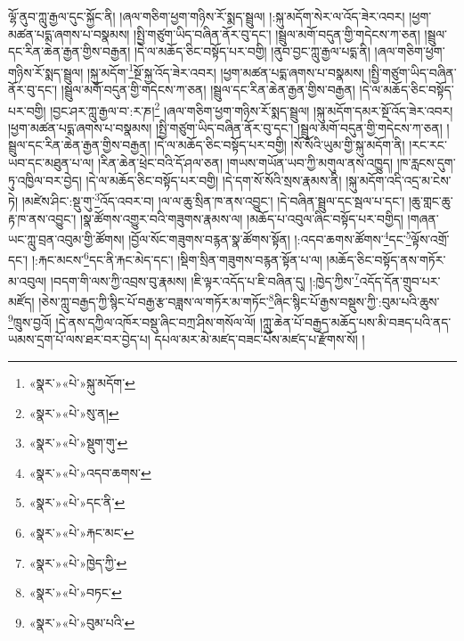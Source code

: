 ལྷོ་ནུབ་ཀླུ་རྒྱལ་དུང་སྐྱོང་ནི། །ཞལ་གཅིག་ཕྱག་གཉིས་རོ་སྨད་སྦྲུལ། །:སྐུ་མདོག་སེར་ལ་འོད་ཟེར་འབར། །ཕྱག་མཚན་པདྨ་ཞགས་པ་བསྣམས། །སྤྱི་གཙུག་ཡིད་བཞིན་ནོར་བུ་དང་། །སྦྲུལ་མགོ་བདུན་གྱི་གདེངས་ཀ་ཅན། །སྦྲུལ་དང་རིན་ཆེན་རྒྱན་གྱིས་བརྒྱན། །དེ་ལ་མཆོད་ཅིང་བསྟོད་པར་བགྱི། །ནུབ་བྱང་ཀླུ་རྒྱལ་པདྨ་ནི། །ཞལ་གཅིག་ཕྱག་གཉིས་རོ་སྨད་སྦྲུལ། །སྐུ་མདོག་\footnote{«སྣར་»«པེ་»སྐུ་མདོག་}སྔོ་སྐྱ་འོད་ཟེར་འབར། །ཕྱག་མཚན་པདྨ་ཞགས་པ་བསྣམས། །སྤྱི་གཙུག་ཡིད་བཞིན་ནོར་བུ་དང་། །སྦྲུལ་མགོ་བདུན་གྱི་གདེངས་ཀ་ཅན། །སྦྲུལ་དང་རིན་ཆེན་རྒྱན་གྱིས་བརྒྱན། །དེ་ལ་མཆོད་ཅིང་བསྟོད་པར་བགྱི། །བྱང་ཤར་ཀླུ་རྒྱལ་བ་:ར་ཎ།\footnote{«སྣར་»«པེ་»སུ་ན།} །ཞལ་གཅིག་ཕྱག་གཉིས་རོ་སྨད་སྦྲུལ། །སྐུ་མདོག་དམར་སྔོ་འོད་ཟེར་འབར། །ཕྱག་མཚན་པདྨ་ཞགས་པ་བསྣམས། །སྤྱི་གཙུག་ཡིད་བཞིན་ནོར་བུ་དང་། །སྦྲུལ་མགོ་བདུན་གྱི་གདེངས་ཀ་ཅན། །སྦྲུལ་དང་རིན་ཆེན་རྒྱན་གྱིས་བརྒྱན། །དེ་ལ་མཆོད་ཅིང་བསྟོད་པར་བགྱི། །སོ་སོའི་ཡུམ་གྱི་སྐུ་མདོག་ནི། །རང་རང་ཡབ་དང་མཐུན་པ་ལ། །རིན་ཆེན་ཕྲེང་བའི་དོ་ཤལ་ཅན། །གཡས་གཡོན་ཡབ་ཀྱི་མགུལ་ནས་འཁྱུད། །ཁ་རླངས་དུག་ཏུ་འཁྱིལ་བར་བྱེད། །དེ་ལ་མཆོད་ཅིང་བསྟོད་པར་བགྱི། །དེ་དག་སོ་སོའི་སྲས་རྣམས་ནི། །སྐུ་མདོག་འདི་འདྲ་མ་ངེས་ཏེ། །མཛེས་ཤིང་:སྡུ་གུ་\footnote{«སྣར་»«པེ་»སྡུག་གུ་}འོད་འབར་བ། །ལ་ལ་ཆུ་སྲིན་ཁ་ནས་འབྱུང་། །དེ་བཞིན་སྦྲུལ་དང་སྦལ་པ་དང་། །ཆུ་གླང་ཆུ་རྟ་ཁ་ནས་འབྱུང་། །སྣ་ཚོགས་འགྱུར་བའི་གཟུགས་རྣམས་ལ། །མཆོད་པ་འབུལ་ཞིང་བསྟོད་པར་བགྱིད། །གཞན་ཡང་ཀླུ་བྲན་འབུམ་གྱི་ཚོགས། །བྱོལ་སོང་གཟུགས་བརྙན་སྣ་ཚོགས་སྟོན། །:འདབ་ཆགས་ཚོགས་\footnote{«སྣར་»«པེ་»འདབ་ཆགས་}དང་\footnote{«སྣར་»«པེ་»དང་ནི་}ལྟོས་འགྲོ་དང་། །:རྐང་མངས་\footnote{«སྣར་»«པེ་»རྐང་མང་}དང་ནི་རྐང་མེད་དང་། །སྡིག་སྲིན་གཟུགས་བརྙན་སྟོན་པ་ལ། །མཆོད་ཅིང་བསྟོད་ནས་གཏོར་མ་འབུལ། །བདག་གི་ལས་ཀྱི་འབྲས་བུ་རྣམས། །ཇི་ལྟར་འདོད་པ་ཇི་བཞིན་དུ། །:ཁྱེད་ཀྱིས་\footnote{«སྣར་»«པེ་»ཁྱེད་ཀྱི་}འདོད་དོན་གྲུབ་པར་མཛོད། །ཅེས་ཀླུ་བརྒྱད་ཀྱི་སྙིང་པོ་བརྒྱ་རྩ་བཟླས་ལ་གཏོར་མ་གཏོང་\footnote{«སྣར་»«པེ་»བཏང་}ཞིང་སྙིང་པོ་རྒྱས་བསྡུས་ཀྱི་:བུམ་པའི་ཆུས་\footnote{«སྣར་»«པེ་»བུམ་པའི་}ཁྲུས་བྱའོ། །དེ་ནས་དཀྱིལ་འཁོར་བསྡུ་ཞིང་བཀྲ་ཤིས་གསོལ་ལོ། །ཀླུ་ཆེན་པོ་བརྒྱད་མཆོད་པས་མི་བཟད་པའི་ནད་ཡམས་དྲག་པོ་ལས་ཐར་བར་བྱེད་པ། དཔལ་མར་མེ་མཛད་བཟང་པོས་མཛད་པ་རྫོགས་སོ། ། 